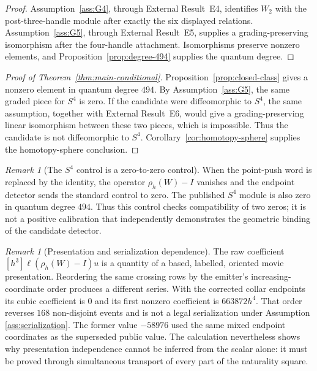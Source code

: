 \documentclass[10pt,reqno]{amsart}
\theoremstyle{definition}
\theoremstyle{remark}
\newtheorem{remark}[theorem]{Remark}
\begin{document}
\begin{proof}
Assumption~\ref{ass:G4}, through External Result~E4, identifies
$W_2$ with the post-three-handle module after exactly the six displayed
relations.  Assumption~\ref{ass:G5}, through External Result~E5, supplies a
grading-preserving isomorphism after the four-handle attachment.  Isomorphisms preserve
nonzero elements, and Proposition~\ref{prop:degree-494} supplies the quantum
degree.
\end{proof}

\begin{proof}[Proof of Theorem~\ref{thm:main-conditional}]
Proposition~\ref{prop:closed-class} gives a nonzero element in quantum degree
$494$.  By Assumption~\ref{ass:G5}, the same graded piece for $S^4$
is zero.  If the candidate were diffeomorphic to $S^4$, the same assumption,
together with External Result~E6, would give a grading-preserving linear
isomorphism between these two pieces, which is impossible.  Thus the
candidate is not diffeomorphic to $S^4$.  Corollary~\ref{cor:homotopy-sphere}
supplies the homotopy-sphere conclusion.
\end{proof}

\begin{remark}[The $S^4$ control is a zero-to-zero control]\label{rem:s4-control}
When the point-push word is replaced by the identity, the operator
$\rho_h(W)-I$ vanishes and the endpoint detector sends the standard control
to zero.  The published $S^4$ module is also zero in quantum degree $494$.
Thus this control checks compatibility of two zeros; it is not a positive
calibration that independently demonstrates the geometric binding of the
candidate detector.
\end{remark}

\begin{remark}[Presentation and serialization dependence]\label{rem:serialization}
The raw coefficient $[h^3]\ell(\rho_h(W)-I)u$ is a quantity of a based,
labelled, oriented movie presentation.  Reordering the same crossing rows by
the emitter's increasing-coordinate order produces a different series.  With
the corrected collar endpoints its cubic coefficient is $0$ and its first
nonzero coefficient is $663872h^4$.  That order reverses $168$ non-disjoint
events and is not a legal serialization under Assumption
\ref{ass:serialization}.  The former value $-58976$ used the same mixed
endpoint coordinates as the superseded public value.  The calculation
nevertheless shows why
presentation independence cannot be inferred from the scalar alone: it must
be proved through simultaneous transport of every part of the naturality
square.
\end{remark}
\end{document}
